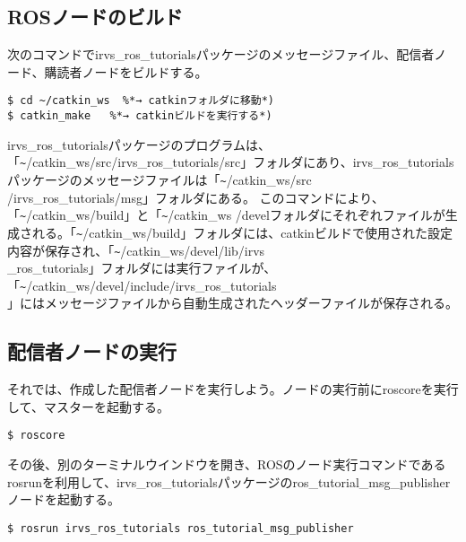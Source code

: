 \subsection{ROSノードのビルド}

次のコマンドでirvs\_ros\_tutorialsパッケージのメッセージファイル、配信者ノード、購読者ノードをビルドする。

\begin{lstlisting}[language=ROS]
$ cd ~/catkin_ws  %*→ catkinフォルダに移動*)
$ catkin_make   %*→ catkinビルドを実行する*)
\end{lstlisting}

irvs\_ros\_tutorialsパッケージのプログラムは、「\verb|~|/catkin\_ws/src/irvs\_ros\_tutorials/src」フォルダにあり、irvs\_ros\_tutorialsパッケージのメッセージファイルは「\verb|~|/catkin\_ws/src\\/irvs\_ros\_tutorials/msg」フォルダにある。
このコマンドにより、「\verb|~|/catkin\_ws/build」と「\verb|~|/catkin\_ws /develフォルダにそれぞれファイルが生成される。「\verb|~|/catkin\_ws/build」フォルダには、catkinビルドで使用された設定内容が保存され、「\verb|~|/catkin\_ws/devel/lib/irvs\\\_ros\_tutorials」フォルダには実行ファイルが、「\verb|~|/catkin\_ws/devel/include/irvs\_ros\_tutorials\\」にはメッセージファイルから自動生成されたヘッダーファイルが保存される。

\subsection{配信者ノードの実行}

それでは、作成した配信者ノードを実行しよう。ノードの実行前にroscoreを実行して、マスターを起動する。

\begin{lstlisting}[language=ROS]
$ roscore
\end{lstlisting}

その後、別のターミナルウインドウを開き、ROSのノード実行コマンドであるrosrunを利用して、irvs\_ros\_tutorialsパッケージのros\_tutorial\_msg\_publisherノードを起動する。

\begin{lstlisting}[language=ROS]
$ rosrun irvs_ros_tutorials ros_tutorial_msg_publisher
\end{lstlisting}

